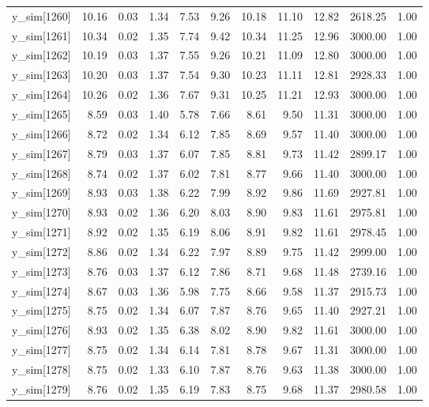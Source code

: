 \begin{table}[ht]
\begin{tabular}{rrrrrrrrrrr}
  y\_sim[1260] & 10.16 & 0.03 & 1.34 & 7.53 & 9.26 & 10.18 & 11.10 & 12.82 & 2618.25 & 1.00 \\ 
  y\_sim[1261] & 10.34 & 0.02 & 1.35 & 7.74 & 9.42 & 10.34 & 11.25 & 12.96 & 3000.00 & 1.00 \\ 
  y\_sim[1262] & 10.19 & 0.03 & 1.37 & 7.55 & 9.26 & 10.21 & 11.09 & 12.80 & 3000.00 & 1.00 \\ 
  y\_sim[1263] & 10.20 & 0.03 & 1.37 & 7.54 & 9.30 & 10.23 & 11.11 & 12.81 & 2928.33 & 1.00 \\ 
  y\_sim[1264] & 10.26 & 0.02 & 1.36 & 7.67 & 9.31 & 10.25 & 11.21 & 12.93 & 3000.00 & 1.00 \\ 
  y\_sim[1265] & 8.59 & 0.03 & 1.40 & 5.78 & 7.66 & 8.61 & 9.50 & 11.31 & 3000.00 & 1.00 \\ 
  y\_sim[1266] & 8.72 & 0.02 & 1.34 & 6.12 & 7.85 & 8.69 & 9.57 & 11.40 & 3000.00 & 1.00 \\ 
  y\_sim[1267] & 8.79 & 0.03 & 1.37 & 6.07 & 7.85 & 8.81 & 9.73 & 11.42 & 2899.17 & 1.00 \\ 
  y\_sim[1268] & 8.74 & 0.02 & 1.37 & 6.02 & 7.81 & 8.77 & 9.66 & 11.40 & 3000.00 & 1.00 \\ 
  y\_sim[1269] & 8.93 & 0.03 & 1.38 & 6.22 & 7.99 & 8.92 & 9.86 & 11.69 & 2927.81 & 1.00 \\ 
  y\_sim[1270] & 8.93 & 0.02 & 1.36 & 6.20 & 8.03 & 8.90 & 9.83 & 11.61 & 2975.81 & 1.00 \\ 
  y\_sim[1271] & 8.92 & 0.02 & 1.35 & 6.19 & 8.06 & 8.91 & 9.82 & 11.61 & 2978.45 & 1.00 \\ 
  y\_sim[1272] & 8.86 & 0.02 & 1.34 & 6.22 & 7.97 & 8.89 & 9.75 & 11.42 & 2999.00 & 1.00 \\ 
  y\_sim[1273] & 8.76 & 0.03 & 1.37 & 6.12 & 7.86 & 8.71 & 9.68 & 11.48 & 2739.16 & 1.00 \\ 
  y\_sim[1274] & 8.67 & 0.03 & 1.36 & 5.98 & 7.75 & 8.66 & 9.58 & 11.37 & 2915.73 & 1.00 \\ 
  y\_sim[1275] & 8.75 & 0.02 & 1.34 & 6.07 & 7.87 & 8.76 & 9.65 & 11.40 & 2927.21 & 1.00 \\ 
  y\_sim[1276] & 8.93 & 0.02 & 1.35 & 6.38 & 8.02 & 8.90 & 9.82 & 11.61 & 3000.00 & 1.00 \\ 
  y\_sim[1277] & 8.75 & 0.02 & 1.34 & 6.14 & 7.81 & 8.78 & 9.67 & 11.31 & 3000.00 & 1.00 \\ 
  y\_sim[1278] & 8.75 & 0.02 & 1.33 & 6.10 & 7.87 & 8.76 & 9.63 & 11.38 & 3000.00 & 1.00 \\ 
  y\_sim[1279] & 8.76 & 0.02 & 1.35 & 6.19 & 7.83 & 8.75 & 9.68 & 11.37 & 2980.58 & 1.00 \\ 

\end{tabular}
\end{table}
